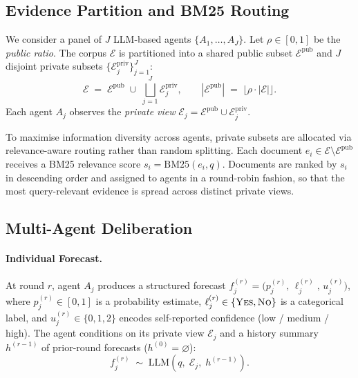 \documentclass[11pt]{article}
\theoremstyle{definition}          %
\begin{document}
\subsection{Evidence Partition and BM25 Routing}

We consider a panel of $J$ LLM-based agents $\{A_1, \dots, A_J\}$.
Let $\rho \in [0,1]$ be the \emph{public ratio}.
The corpus $\mathcal{E}$ is partitioned into a shared public subset $\mathcal{E}^{\mathrm{pub}}$
and $J$ disjoint private subsets $\{\mathcal{E}_j^{\mathrm{priv}}\}_{j=1}^{J}$:
\begin{equation}
  \mathcal{E} \;=\; \mathcal{E}^{\mathrm{pub}} \;\cup\; \bigsqcup_{j=1}^{J} \mathcal{E}_j^{\mathrm{priv}},
  \qquad
  |\mathcal{E}^{\mathrm{pub}}| \;=\; \lfloor \rho \cdot |\mathcal{E}| \rfloor.
  \label{eq:partition}
\end{equation}
Each agent $A_j$ observes the \emph{private view}
$\mathcal{E}_j = \mathcal{E}^{\mathrm{pub}} \cup \mathcal{E}_j^{\mathrm{priv}}$.

To maximise information diversity across agents, private subsets are allocated via
relevance-aware routing rather than random splitting.
Each document $e_i \in \mathcal{E} \setminus \mathcal{E}^{\mathrm{pub}}$ receives a BM25
relevance score $s_i = \mathrm{BM25}(e_i, q)$.
Documents are ranked by $s_i$ in descending order and assigned to agents
in a round-robin fashion, so that the most query-relevant evidence is
spread across distinct private views.

\subsection{Multi-Agent Deliberation}

\paragraph{Individual Forecast.}
At round $r$, agent $A_j$ produces a structured forecast
$f_j^{(r)} = \bigl(p_j^{(r)},\, \ell_j^{(r)},\, u_j^{(r)}\bigr)$,
where $p_j^{(r)} \in [0,1]$ is a probability estimate,
$\ell_j^{(r)} \in \{\textsc{Yes},\textsc{No}\}$ is a categorical label,
and $u_j^{(r)} \in \{0,1,2\}$ encodes self-reported confidence
(low / medium / high).
The agent conditions on its private view $\mathcal{E}_j$
and a history summary $h^{(r-1)}$ of prior-round forecasts ($h^{(0)} = \varnothing$):
\begin{equation}
  f_j^{(r)} \;\sim\; \mathrm{LLM}\!\left(q,\; \mathcal{E}_j,\; h^{(r-1)}\right).
  \label{eq:agent}
\end{equation}
\end{document}
